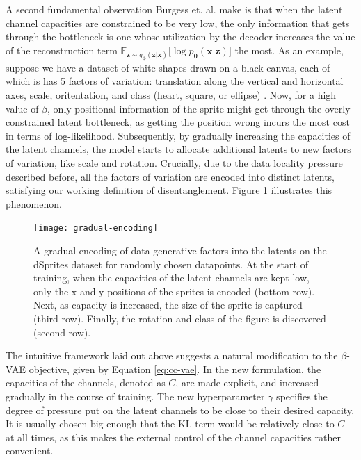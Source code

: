 \documentclass{report}
\begin{document}
\noindent A second fundamental observation Burgess et. al. \cite{understanding-beta-vae} make is that when the latent channel capacities are constrained to be very low, the only information that gets through the bottleneck is one whose utilization by the decoder increases the value of the reconstruction term $\mathbb{E}_{\boldsymbol{z} \sim q_{\boldsymbol{\phi}}(\boldsymbol{z}|\boldsymbol{x})} \big[ \log p_{\boldsymbol{\theta}} (\boldsymbol{x} | \boldsymbol{z}) \big]$ the most. As an example, suppose we have a dataset of white shapes drawn on a black canvas, each of which is has 5 factors of variation: translation along the vertical and horizontal axes, scale, oritentation, and class (heart, square, or ellipse) \cite{dsprites17}. Now, for a high value of $\beta$, only positional information of the sprite might get through the overly constrained latent bottleneck, as getting the position wrong incurs the most cost in terms of log-likelihood. Subsequently, by gradually increasing the capacities of the latent channels, the model starts to allocate additional latents to new factors of variation, like scale and rotation. Crucially, due to the data locality pressure described before, all the factors of variation are encoded into distinct latents, satisfying our working definition of disentanglement. Figure \ref{fig:dsprites-trav} illustrates this phenomenon. \\

\begin{figure}[H]
\begin{center}
\texttt{[image: gradual-encoding]}
\caption{A gradual encoding of data generative factors into the latents on the dSprites dataset \cite{dsprites17} for randomly chosen datapoints. At the start of training, when the capacities of the latent channels are kept low, only the x and y positions of the sprites is encoded (bottom row). Next, as capacity is increased, the size of the sprite is captured (third row). Finally, the rotation and class of the figure is discovered (second row).}
\label{fig:dsprites-trav}
\end{center}
\end{figure}

\noindent The intuitive framework laid out above suggests a natural modification to the $\beta$-VAE objective, given by Equation \ref{eq:cc-vae}. In the new formulation, the capacities of the channels, denoted as $C$, are made explicit, and increased gradually in the course of training. The new hyperparameter $\gamma$ specifies the degree of pressure put on the latent channels to be close to their desired capacity. It is usually chosen big enough that the KL term would be relatively close to $C$ at all times, as this makes the external control of the channel capacities rather convenient.
\end{document}
